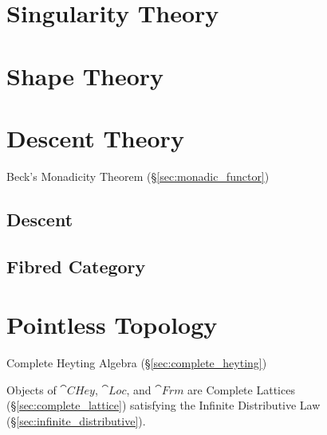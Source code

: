 \section{Singularity Theory}\label{sec:singularity_theory}

\section{Shape Theory}\label{sec:shape_theory}

\section{Descent Theory}\label{sec:descent_theory}

Beck's Monadicity Theorem (\S\ref{sec:monadic_functor})



\subsection{Descent}\label{sec:descent}

\subsection{Fibred Category}\label{sec:fibred_category}



\section{Pointless Topology}\label{sec:pointless_topology}

Complete Heyting Algebra (\S\ref{sec:complete_heyting})

Objects of $\cat{CHey}$, $\cat{Loc}$, and $\cat{Frm}$ are Complete
Lattices (\S\ref{sec:complete_lattice}) satisfying the Infinite
Distributive Law (\S\ref{sec:infinite_distributive}).

